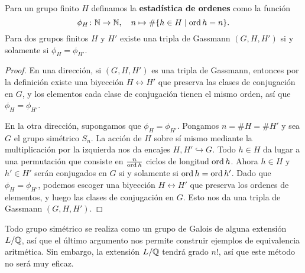 \begin{proposicion}
  Para un grupo finito $H$ definamos la \textbf{estadística de ordenes} como la
  función
  \[ \phi_H\colon \mathbb{N} \to \mathbb{N}, \quad
    n \mapsto \# \{ h\in H \mid \operatorname{ord} h = n \}. \]
  Para dos grupos finitos $H$ y $H'$ existe una tripla de Gassmann $(G,H,H')$
  si y solamente si $\phi_H = \phi_{H'}$.

  \begin{proof}
    En una dirección, si $(G,H,H')$ es una tripla de Gassmann, entonces por la
    definición existe una biyección $H \leftrightarrow H'$ que preserva las
    clases de conjugación en $G$, y los elementos cada clase de conjugación
    tienen el mismo orden, así que $\phi_H = \phi_{H'}$.

    En la otra dirección, supongamos que $\phi_H = \phi_{H'}$. Pongamos
    $n = \# H = \# H'$ y sea $G$ el grupo simétrico $S_n$. La acción de $H$
    sobre sí mismo mediante la multiplicación por la izquierda nos da encajes
    $H, H' \hookrightarrow G$. Todo $h \in H$ da lugar a una permutación que
    consiste en $\frac{n}{\operatorname{ord} h}$ ciclos de longitud $\operatorname{ord} h$. Ahora $h \in H$
    y $h' \in H'$ serán conjugados en $G$ si y solamente si $\operatorname{ord} h = \operatorname{ord} h'$.
    Dado que $\phi_H = \phi_{H'}$, podemos escoger una biyección
    $H \leftrightarrow H'$ que preserva los ordenes de elementos, y luego las
    clases de conjugación en $G$. Esto nos da una tripla de Gassmann $(G,H,H')$.
  \end{proof}
\end{proposicion}

Todo grupo simétrico se realiza como un grupo de Galois de alguna extensión
$L/\mathbb{Q}$, así que el último argumento nos permite construir ejemplos de
equivalencia aritmética. Sin embargo, la extensión $L/\mathbb{Q}$ tendrá grado $n!$,
así que este método no será muy eficaz.

